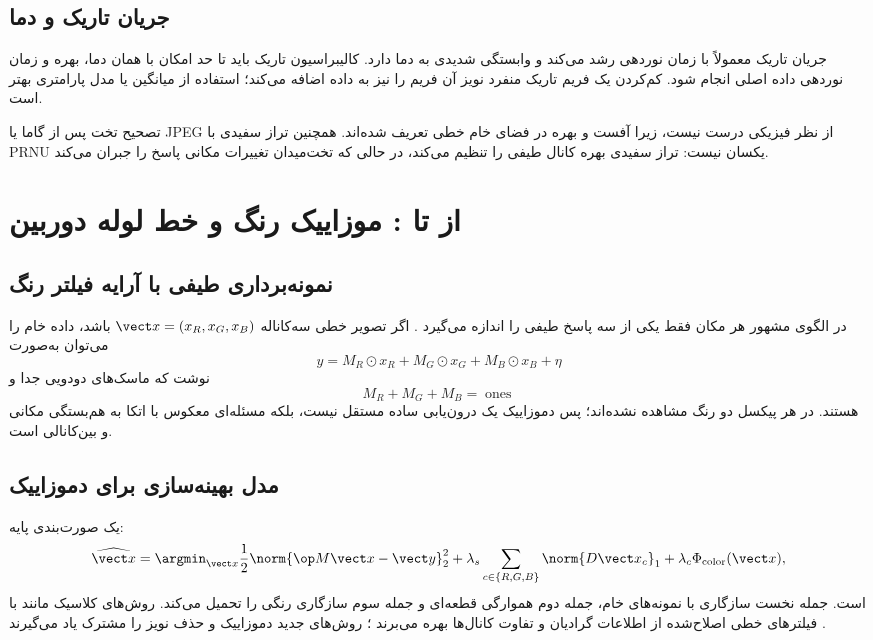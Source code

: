 \subsection{جریان تاریک و دما}

جریان تاریک معمولاً با زمان نوردهی رشد می‌کند و وابستگی شدیدی به دما دارد. کالیبراسیون تاریک باید
تا حد امکان با همان دما، بهره و زمان نوردهی داده اصلی انجام شود. کم‌کردن یک فریم تاریک منفرد نویز
آن فریم را نیز به داده اضافه می‌کند؛ استفاده از میانگین یا مدل پارامتری بهتر است.

\begin{warningbox}
تصحیح تخت پس از گاما یا JPEG از نظر فیزیکی درست نیست، زیرا آفست و بهره در فضای خام خطی تعریف
شده‌اند. همچنین تراز سفیدی با PRNU یکسان نیست: تراز سفیدی بهره کانال طیفی را تنظیم می‌کند، در حالی
که تخت‌میدان تغییرات مکانی پاسخ را جبران می‌کند.
\end{warningbox}

\section{از  تا : موزاییک رنگ و خط لوله دوربین}

\subsection{نمونه‌برداری طیفی با آرایه فیلتر رنگ}

در الگوی مشهور  هر مکان فقط یکی از سه پاسخ طیفی را اندازه می‌گیرد
\cite{bayer1976patent}. اگر تصویر خطی سه‌کاناله \(\vect x=(x_R,x_G,x_B)\) باشد، داده خام را می‌توان
به‌صورت
\begin{equation}
y= M_R\odot x_R+M_G\odot x_G+M_B\odot x_B+\eta
\label{eq:bayer-forward}
\end{equation}
نوشت که ماسک‌های دودویی جدا و
\begin{equation}
M_R+M_G+M_B=\operatorname{ones}
\end{equation}
هستند. در هر پیکسل دو رنگ مشاهده نشده‌اند؛ پس دموزاییک یک درون‌یابی ساده مستقل نیست، بلکه
مسئله‌ای معکوس با اتکا به هم‌بستگی مکانی و بین‌کانالی است.

\subsection{مدل بهینه‌سازی برای دموزاییک}

یک صورت‌بندی پایه:
\begin{equation}
\widehat{\vect x}=\argmin_{\vect x}
\frac12\norm{\op M\vect x-\vect y}_2^2
+\lambda_s\sum_{c\in\{R,G,B\}}\norm{D\vect x_c}_1
+\lambda_c\Phi_{\mathrm{color}}(\vect x),
\label{eq:demosaic-optimization}
\end{equation}
است. جمله نخست سازگاری با نمونه‌های خام، جمله دوم هموارگی قطعه‌ای و جمله سوم سازگاری رنگی را
تحمیل می‌کند. روش‌های کلاسیک مانند  با فیلترهای خطی اصلاح‌شده از اطلاعات
گرادیان و تفاوت کانال‌ها بهره می‌برند \cite{malvar2004demosaic}؛ روش‌های جدید دموزاییک و حذف نویز
را مشترک یاد می‌گیرند \cite{ehret2019joint}.

